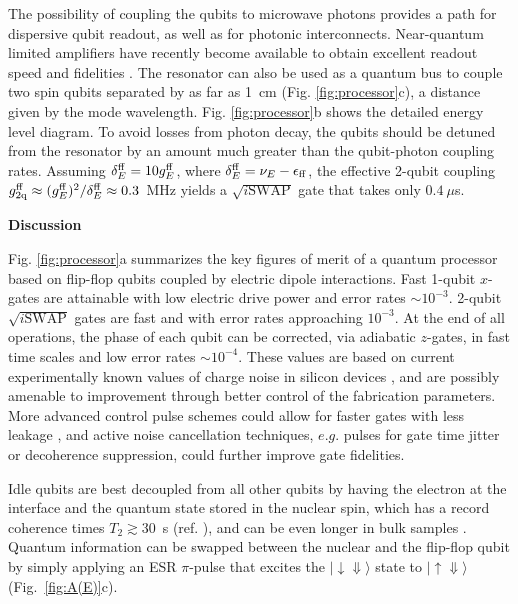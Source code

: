 \documentclass[aps,prb,superscriptaddress,nobibnotes,preprint]{revtex4-1}%
\begin{document}
The possibility of coupling the qubits to microwave photons provides a path for dispersive qubit readout, as well as for photonic interconnects. Near-quantum limited amplifiers have recently become available to obtain excellent readout speed and fidelities \cite{Castellanos2008}. The resonator can also be used as a quantum bus to couple two spin qubits separated by as far as 1~cm (Fig. \ref{fig:processor}c), a distance given by the mode wavelength. Fig. \ref{fig:processor}b shows the detailed energy level diagram. To avoid losses from photon decay, the qubits should be detuned from the resonator by an amount much greater than the qubit-photon coupling rates. Assuming $\delta^{\rm ff}_E=10g_{E}^{\rm ff}$, where $\delta^{\rm ff}_E=\nu_E-\epsilon_{\rm ff}$, the effective 2-qubit coupling $g_{\rm 2q}^{\rm ff}\approx(g_E^{\rm ff})^2/\delta^{\rm ff}_E\approx 0.3$~MHz yields a $\sqrt{i\mathrm{SWAP}}$ gate that takes only $0.4~\mu$s.


\vspace{3mm}
\noindent\textbf{Discussion}

\noindent
Fig. \ref{fig:processor}a summarizes the key figures of merit of a quantum processor based on flip-flop qubits coupled by electric dipole interactions. Fast 1-qubit $x$-gates are attainable with low electric drive power and error rates $\sim10^{-3}$. 2-qubit $\sqrt{i\mathrm{SWAP}}$ gates are fast and with error rates approaching $10^{-3}$. At the end of all operations, the phase of each qubit can be corrected, via adiabatic $z$-gates, in fast time scales and low error rates $\sim10^{-4}$. These values are based on current experimentally known values of charge noise in silicon devices \cite{Freeman2016}, and are possibly amenable to improvement through better control of the fabrication parameters. More advanced control pulse schemes could allow for faster gates with less leakage \cite{Motzoi2009,Ghosh2016,Werschnik2007}, and active noise cancellation techniques, $e.g.$ pulses for gate time jitter \cite{Hill2007} or decoherence \cite{Sar2012} suppression, could further improve gate fidelities. 

Idle qubits are best decoupled from all other qubits by having the electron at the interface and the quantum state stored in the nuclear spin, which has a record coherence times $T_2 \gtrsim 30$~s (ref. ), and can be even longer in bulk samples \cite{Saeedi2013}. Quantum information can be swapped between the nuclear and the flip-flop qubit by simply applying an ESR $\pi$-pulse that excites the $\lvert{\downarrow\Downarrow}\rangle$ state to $\lvert{\uparrow\Downarrow}\rangle$ (Fig.~\ref{fig:A(E)}c).
\end{document}

